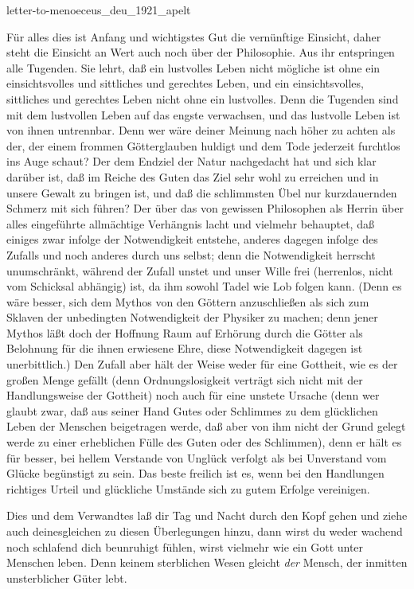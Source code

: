 \documentclass{stex}
\begin{document}
\begin{smodule}{letter-to-menoeceus_deu_1921_apelt}
\begin{sparagraph}[id=letter-to-menoeceus,name=Letter to Menoeceus]
  Für alles dies ist Anfang und wichtigstes Gut die vernünftige Einsicht, daher steht die Einsicht an Wert auch noch über der Philosophie.
  Aus ihr entspringen alle Tugenden.
  Sie lehrt, daß ein lustvolles Leben nicht mögliche ist ohne ein einsichtsvolles und sittliches und gerechtes Leben, und ein einsichtsvolles, sittliches und gerechtes Leben nicht ohne ein lustvolles.
  Denn die Tugenden sind mit dem lustvollen Leben auf das engste verwachsen, und das lustvolle Leben ist von ihnen untrennbar.
  Denn wer wäre deiner Meinung nach höher zu achten als der, der einem frommen Götterglauben huldigt und dem Tode jederzeit furchtlos ins Auge schaut?
  Der dem Endziel der Natur nachgedacht hat und sich klar darüber ist, daß im Reiche des Guten das Ziel sehr wohl zu erreichen und in unsere Gewalt zu bringen ist, und daß die schlimmsten Übel nur kurzdauernden Schmerz mit sich führen?
  Der über das von gewissen Philosophen als Herrin über alles eingeführte allmächtige Verhängnis lacht und vielmehr behauptet, daß einiges zwar infolge der Notwendigkeit entstehe, anderes dagegen infolge des Zufalls und noch anderes durch uns selbst; denn die Notwendigkeit herrscht unumschränkt, während der Zufall unstet und unser Wille frei (herrenlos, \dasIst nicht vom Schicksal abhängig) ist, da ihm sowohl Tadel wie Lob folgen kann.
  (Denn es wäre besser, sich dem Mythos von den Göttern anzuschließen als sich zum Sklaven der unbedingten Notwendigkeit der Physiker zu machen; denn jener Mythos läßt doch der Hoffnung Raum auf Erhörung durch die Götter als Belohnung für die ihnen erwiesene Ehre, diese Notwendigkeit dagegen ist unerbittlich.)
  Den Zufall aber hält der Weise weder für eine Gottheit, wie es der großen Menge gefällt (denn Ordnungslosigkeit verträgt sich nicht mit der Handlungsweise der Gottheit) noch auch für eine unstete Ursache (denn wer glaubt zwar, daß aus seiner Hand Gutes oder Schlimmes zu dem glücklichen Leben der Menschen beigetragen werde, daß aber von ihm nicht der Grund gelegt werde zu einer erheblichen Fülle des Guten oder des Schlimmen), denn er hält es für besser, bei hellem Verstande von Unglück verfolgt als bei Unverstand vom Glücke begünstigt zu sein.
  Das beste freilich ist es, wenn bei den Handlungen richtiges Urteil und glückliche Umstände sich zu gutem Erfolge vereinigen.

  Dies und dem Verwandtes laß dir Tag und Nacht durch den Kopf gehen und ziehe auch deinesgleichen zu diesen Überlegungen hinzu, dann wirst du weder wachend noch schlafend dich beunruhigt fühlen, wirst vielmehr wie ein Gott unter Menschen leben.
  Denn keinem sterblichen Wesen gleicht \emph{der} Mensch, der inmitten unsterblicher Güter lebt.
\end{sparagraph}
\end{smodule}
\end{document}
